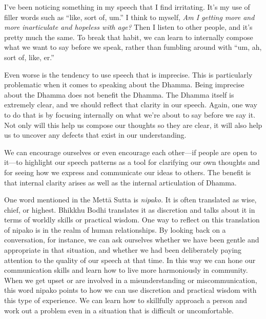 
I've been noticing something in my speech that I find irritating. It's 
my use of filler words such as ``like, sort of, um.'' I think to 
myself, \emph{Am I getting more and more inarticulate and hopeless with 
age?} Then I listen to other people, and it's pretty much the same. To 
break that habit, we can learn to internally compose what we want to 
say before we speak, rather than fumbling around with ``um, ah, sort 
of, like, er.''

Even worse is the tendency to use speech that is imprecise. This is 
particularly problematic when it comes to speaking about the Dhamma. 
Being imprecise about the Dhamma does not benefit the Dhamma. The 
Dhamma itself is extremely clear, and we should reflect that clarity in 
our speech. Again, one way to do that is by focusing internally on what 
we're about to say before we say it. Not only will this help us compose 
our thoughts so they are clear, it will also help us to uncover any 
defects that exist in our understanding.

We can encourage ourselves or even encourage each other---if people are 
open to it---to highlight our speech patterns as a tool for clarifying 
our own thoughts and for seeing how we express and communicate our 
ideas to others. The benefit is that internal clarity arises as well as 
the internal articulation of Dhamma.


One word mentioned in the Mettā Sutta is \emph{nipako.} It is often 
translated as wise, chief, or highest. Bhikkhu Bodhi translates it as 
discretion and talks about it in terms of worldly skills or practical 
wisdom. One way to reflect on this translation of nipako is in the 
realm of human relationships. By looking back on a conversation, for 
instance, we can ask ourselves whether we have been gentle and 
appropriate in that situation, and whether we had been deliberately 
paying attention to the quality of our speech at that time. In this way 
we can hone our communication skills and learn how to live more 
harmoniously in community. When we get upset or are involved in a 
misunderstanding or miscommunication, this word nipako points to how we 
can use discretion and practical wisdom with this type of experience. 
We can learn how to skillfully approach a person and work out a problem 
even in a situation that is difficult or uncomfortable.

